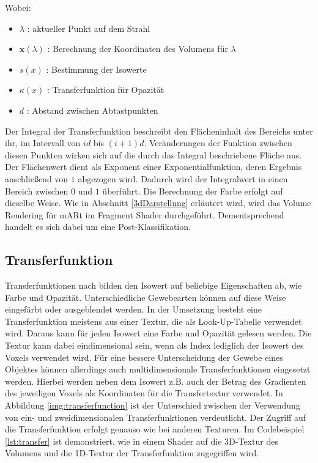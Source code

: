 Wobei:
\begin{itemize}
\item $\lambda$ 			: aktueller Punkt auf dem Strahl
\item $\mathbf{x}(\lambda)$ : Berechnung der Koordinaten des Volumens für $\lambda$
\item $s(x)$				: Bestimmung der Isowerte
\item $\kappa(x)$			: Transferfunktion für Opazität
\item $d$					: Abstand zwischen Abtastpunkten
\end{itemize}
 

Der Integral der Transferfunktion beschreibt den Flächeninhalt des Bereichs unter ihr, im Intervall von $id$ bis $(i+1)d$. Veränderungen der Funktion zwischen diesen Punkten wirken sich auf die durch das Integral beschriebene Fläche aus. 
Der Flächenwert dient als Exponent einer Exponentialfunktion, deren Ergebnis anschließend von $1$ abgezogen wird. Dadurch wird der Integralwert in einen Bereich zwischen $0$ und $1$ überführt. 
Die Berechnung der Farbe erfolgt auf dieselbe Weise.
Wie in Abschnitt \ref{3dDarstellung} erläutert wird, wird das Volume Rendering für mARt im Fragment Shader durchgeführt. Dementsprechend handelt es sich dabei um eine Post-Klassifikation.

\subsection{Transferfunktion}

Transferfunktionen nach \cite{Fernando04} bilden den Isowert auf beliebige Eigenschaften ab, wie  Farbe und Opazität.  Unterschiedliche Gewebearten können auf diese Weise eingefärbt oder ausgeblendet werden. In der Umsetzung besteht eine Transferfunktion meistens aus einer Textur, die als Look-Up-Tabelle verwendet wird. Daraus kann für jeden Isowert eine Farbe und Opazität gelesen werden. Die Textur kann dabei eindimensional sein, wenn als Index lediglich der Isowert des Voxels verwendet wird. Für eine bessere Unterscheidung der Gewebe eines Objektes können allerdings auch multidimensionale Transferfunktionen eingesetzt werden. Hierbei werden neben dem Isowert z.B. auch der Betrag des Gradienten des jeweiligen Voxels als Koordinaten für die Transfertextur verwendet. In Abbildung \ref{img:transferfunction} ist der Unterschied zwischen der Verwendung von ein- und zweidimensionalen Transferfunktionen verdeutlicht. Der Zugriff auf die Transferfunktion erfolgt genauso wie bei anderen Texturen. Im Codebeispiel \ref{lst:transfer} ist demonstriert, wie in einem Shader auf die 3D-Textur des Volumens und die 1D-Textur der Transferfunktion zugegriffen wird. 

